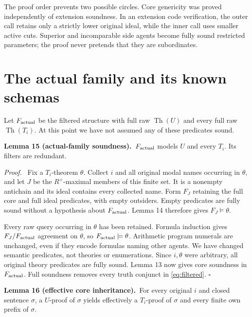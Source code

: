 \documentclass[11pt]{article}
\newcommand{\Th}{\operatorname{Th}}
\newcommand{\qed}{\hfill\ensuremath{\square}}
\newenvironment{proof}{\par\emph{Proof.}\ }{\qed\par}
\newcommand{\statement}[2]{\par\textbf{#1.}\ #2\par}
\begin{document}
The proof order prevents two possible circles. Core genericity was
proved independently of extension soundness. In an extension code
verification, the outer call retains only a strictly lower original
ideal, while the inner call uses smaller active cuts. Superior and
incomparable side agents become fully sound restricted parameters;
the proof never pretends that they are subordinates.

\section{The actual family and its known schemas}\label{sec:finish}

Let $F_{\rm actual}$ be the filtered structure with full raw
$\Th(U)$ and every full raw $\Th(T_i)$. At this point we have not
assumed any of these predicates sound.

\statement{Lemma 15 (actual-family soundness)}{$F_{\rm actual}$
models $U$ and every $T_i$. Its filters are redundant.}

\begin{proof}
Fix a $T_i$-theorem $\theta$. Collect $i$ and all original modal
names occurring in $\theta$, and let $J$ be the $R^+$-maximal
members of this finite set. It is a nonempty antichain and its ideal
contains every collected name. Form $F_J$ retaining the full core
and full ideal predicates, with empty outsiders. Empty predicates
are fully sound without a hypothesis about $F_{\rm actual}$.
Lemma 14 therefore gives $F_J\models\theta$.

Every raw query occurring in $\theta$ has been retained. Formula
induction gives $F_J/F_{\rm actual}$ agreement on $\theta$, so
$F_{\rm actual}\models\theta$. Arithmetic program numerals are
unchanged, even if they encode formulas naming other agents. We
have changed semantic predicates, not theories or enumerations.
Since $i,\theta$ were arbitrary, all original theory predicates are
fully sound. Lemma 13 now gives core soundness in
$F_{\rm actual}$. Full soundness removes every truth conjunct in
\eqref{eq:filtered}.
\end{proof}

\statement{Lemma 16 (effective core inheritance)}{For every original
$i$ and closed sentence $\sigma$, a $U$-proof of $\sigma$ yields
effectively a $T_i$-proof of $\sigma$ and every finite own prefix
of $\sigma$.}
\end{document}
